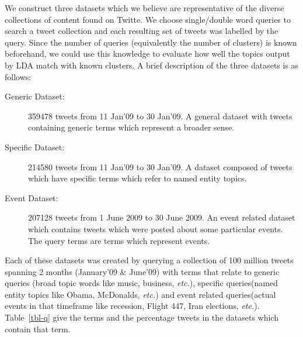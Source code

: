 \documentclass[10pt,a5paper,twoside]{article}
\begin{document}
We construct three datasets which we believe are representative of the diverse collections of content found on Twitte.  We choose single/double word queries to search a tweet collection and each resulting set of tweets was labelled by the query. Since the number of queries (equivalently the number of clusters) is known beforehand, we could use this knowledge to evaluate how well the topics output by LDA match with known clusters. A brief description of the three datasets is as follows:\vspace{-5pt}
\begin{description}
\item[Generic Dataset: ]
 359478 tweets from 11 Jan'09 to 30 Jan'09.
A general dataset with tweets containing generic terms which represent a broader sense.\vspace{-5pt}
\item[Specific Dataset: ]
214580 tweets from 11 Jan'09 to 30 Jan'09.
A dataset composed of tweets which have specific terms which refer to named entity topics.\vspace{-5pt}
\item[Event Dataset: ]
207128 tweets from 1 June 2009 to 30 June 2009.
An event related dataset which contains tweets which were posted about some particular events. The query terms are terms which represent events.\vspace{-5pt}
\end{description}
Each of these datasets was created by querying a collection of 100 million tweets spanning 2 months (January'09 \& June'09) with terms that relate to generic queries (broad topic words like music, business, {\it  etc.}), specific queries(named entity topics like Obama, McDonalds, {\it etc.}) and event related queries(actual events in that timeframe like recession, Flight 447, Iran elections, 
{\it etc.}). 
Table~\ref{tbl-q} give the terms and the percentage tweets in the datasets which contain that term.
\end{document}
